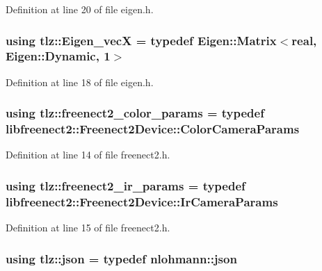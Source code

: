 Definition at line 20 of file eigen.\+h.

\subsubsection[{\texorpdfstring{Eigen\+\_\+vecX}{Eigen_vecX}}]{\setlength{\rightskip}{0pt plus 5cm}using {\bf tlz\+::\+Eigen\+\_\+vecX} = typedef Eigen\+::\+Matrix$<${\bf real}, Eigen\+::\+Dynamic, 1$>$}\hypertarget{namespacetlz_aab627ce949ee3307a5bef93980c4a8df}{}\label{namespacetlz_aab627ce949ee3307a5bef93980c4a8df}


Definition at line 18 of file eigen.\+h.

\subsubsection[{\texorpdfstring{freenect2\+\_\+color\+\_\+params}{freenect2_color_params}}]{\setlength{\rightskip}{0pt plus 5cm}using {\bf tlz\+::freenect2\+\_\+color\+\_\+params} = typedef libfreenect2\+::\+Freenect2\+Device\+::\+Color\+Camera\+Params}\hypertarget{namespacetlz_a5c4bcd0a7cbf071e65a2a4fc68850282}{}\label{namespacetlz_a5c4bcd0a7cbf071e65a2a4fc68850282}


Definition at line 14 of file freenect2.\+h.

\subsubsection[{\texorpdfstring{freenect2\+\_\+ir\+\_\+params}{freenect2_ir_params}}]{\setlength{\rightskip}{0pt plus 5cm}using {\bf tlz\+::freenect2\+\_\+ir\+\_\+params} = typedef libfreenect2\+::\+Freenect2\+Device\+::\+Ir\+Camera\+Params}\hypertarget{namespacetlz_af1f29fddd4d7619e1c21a8a532ff67ef}{}\label{namespacetlz_af1f29fddd4d7619e1c21a8a532ff67ef}


Definition at line 15 of file freenect2.\+h.

\subsubsection[{\texorpdfstring{json}{json}}]{\setlength{\rightskip}{0pt plus 5cm}using {\bf tlz\+::json} = typedef nlohmann\+::json}\hypertarget{namespacetlz_ac400657dfcddf6309a769aefc23eed0c}{}\label{namespacetlz_ac400657dfcddf6309a769aefc23eed0c}


